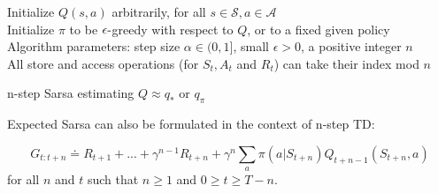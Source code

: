 \documentclass[11pt]{article}
\begin{document}
\begin{algorithm}[H]
Initialize $Q(s,a)$ arbitrarily, for all $s \in \mathcal{S}, a \in \mathcal{A}$ \\
Initialize $\pi$ to be $\epsilon{\text -}$greedy with respect to $Q$, or to a fixed given policy \\
Algorithm parameters: step size $\alpha \in (0,1]$, small $\epsilon > 0$, a positive integer $n$ \\
All store and access operations (for $S_t, A_t$ and $R_t$) can take their index mod $n$ \\

\;
\;
\caption{n-step Sarsa estimating $Q \approx q_*$ or $q_\pi$}
\end{algorithm}

Expected Sarsa can also be formulated in the context of n-step TD:

\begin{equation}
G_{t:t+n} \doteq R_{t+1} + {...} + \gamma^{n-1} R_{t+n} + \gamma^{n} \sum\limits_{a} \pi(a|S_{t+n}) Q_{t+n-1}(S_{t+n},a)
\end{equation}
for all \(n\) and \(t\) such that \(n \geq 1\) and \(0 \geq t \geq T - n\).
\end{document}
